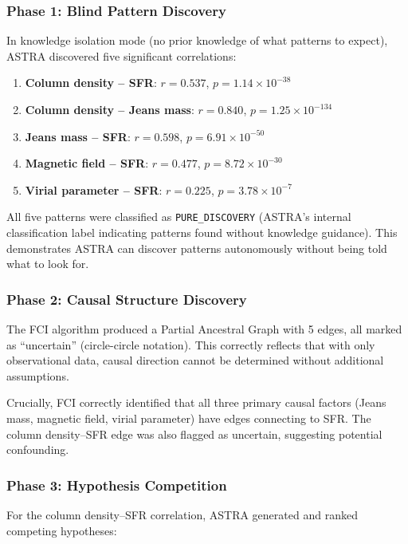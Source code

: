 \documentclass[usenatbib]{rasti}
\begin{document}
\subsubsection{Phase 1: Blind Pattern Discovery}

In knowledge isolation mode (no prior knowledge of what patterns to expect), ASTRA discovered five significant correlations:

\begin{enumerate}
\item \textbf{Column density -- SFR}: $r = 0.537$, $p = 1.14 \times 10^{-38}$
\item \textbf{Column density -- Jeans mass}: $r = 0.840$, $p = 1.25 \times 10^{-134}$
\item \textbf{Jeans mass -- SFR}: $r = 0.598$, $p = 6.91 \times 10^{-50}$
\item \textbf{Magnetic field -- SFR}: $r = 0.477$, $p = 8.72 \times 10^{-30}$
\item \textbf{Virial parameter -- SFR}: $r = 0.225$, $p = 3.78 \times 10^{-7}$
\end{enumerate}

All five patterns were classified as \texttt{PURE\_DISCOVERY} (ASTRA's internal classification label indicating patterns found without knowledge guidance). This demonstrates ASTRA can discover patterns autonomously without being told what to look for.

\subsubsection{Phase 2: Causal Structure Discovery}

The FCI algorithm produced a Partial Ancestral Graph with 5 edges, all marked as ``uncertain'' (circle-circle notation). This correctly reflects that with only observational data, causal direction cannot be determined without additional assumptions.

Crucially, FCI correctly identified that all three primary causal factors (Jeans mass, magnetic field, virial parameter) have edges connecting to SFR. The column density--SFR edge was also flagged as uncertain, suggesting potential confounding.

\subsubsection{Phase 3: Hypothesis Competition}

For the column density--SFR correlation, ASTRA generated and ranked competing hypotheses:
\end{document}
